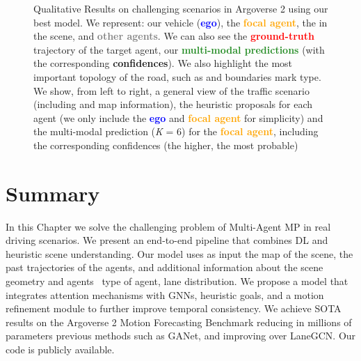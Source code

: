 \begin{figure}[h]
	\caption[Qualitative Results on challenging scenarios in Argoverse 2 using our best model]{Qualitative Results on challenging scenarios in Argoverse 2 using our best model. We represent: our vehicle (\textbf{\textcolor{blue}{ego}}), the \textbf{\textcolor{orange}{focal agent}}, the \textbf{\color{blue-violet}{relevant agents}} in the scene, and \textbf{\textcolor{gray}{other agents}}. We can also see the \textbf{\textcolor{red}{ground-truth}} trajectory of the target agent, our \textbf{\textcolor{ForestGreen}{multi-modal predictions}} (with the corresponding \textbf{confidences}). We also highlight the most important topology of the road, such as {\color{blue-violet}{pedestrian crossing}} and boundaries mark type. We show, from left to right, a general view of the traffic scenario (including and map information), the heuristic proposals for each agent (we only include the \textbf{\textcolor{blue}{ego}} and \textbf{\textcolor{orange}{focal agent}} for simplicity) and the multi-modal prediction (\textit{K} = 6) for the \textbf{\textcolor{orange}{focal agent}}, including the corresponding confidences (the higher, the most probable)}
	\label{fig:chapter_7_Improving_Multi_Agent/argoverse_2_qualitative_results}
\end{figure}

\section{Summary}
\label{sec:7_summary}

In this Chapter we solve the challenging problem of Multi-Agent \ac{MP} in real driving scenarios. We present an end-to-end pipeline that combines \ac{DL} and heuristic scene understanding. Our model uses as input the map of the scene, the past trajectories of the agents, and additional information about the scene geometry and agents \eg \, type of agent, lane distribution. We propose a model that integrates attention mechanisms with \acp{GNN}, heuristic goals, and a motion refinement module to further improve temporal consistency. We achieve \ac{SOTA} results on the Argoverse 2 Motion Forecasting Benchmark reducing in millions of parameters previous methods such as GANet, and improving over LaneGCN. Our code is publicly available. %